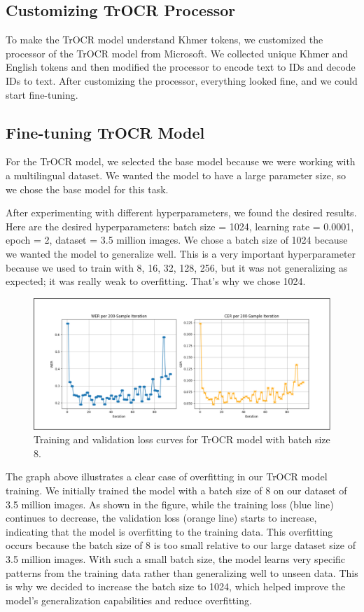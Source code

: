\subsection{Customizing TrOCR Processor}
\label{subsec:customizing-trocr-processor}
To make the TrOCR model understand Khmer tokens, we customized the processor of the TrOCR 
model from Microsoft. We collected unique Khmer and English tokens and then modified the 
processor to encode text to IDs and decode IDs to text. After customizing the processor, 
everything looked fine, and we could start fine-tuning.

\subsection{Fine-tuning TrOCR Model}
\label{subsec:fine-tuning-trocr-model}
For the TrOCR model, we selected the base model because we were working with a multilingual 
dataset. We wanted the model to have a large parameter size, so we chose the base model for 
this task.

After experimenting with different hyperparameters, we found the desired results. Here are the 
desired hyperparameters: batch size = 1024, learning rate = 0.0001, epoch = 2, dataset = 3.5 
million images. We chose a batch size of 1024 because we wanted the model to generalize well. 
This is a very important hyperparameter because we used to train with 8, 16, 32, 128, 256, 
but it was not generalizing as expected; it was really weak to overfitting. That's why we 
chose 1024.

\begin{figure}[ht]
    \centering
    \includegraphics[width=\textwidth]{figures/trocr_overfitting_v1.png}
    \caption{Training and validation loss curves for TrOCR model with batch size 8.}
    \label{fig:trocr-overfitting}
\end{figure}

The graph above illustrates a clear case of overfitting in our TrOCR model training. 
We initially trained the model with a batch size of 8 on our dataset of 3.5 million images. 
As shown in the figure, while the training loss (blue line) continues to decrease, 
the validation loss (orange line) starts to increase, indicating that the model is overfitting 
to the training data. This overfitting occurs because the batch size of 8 is too small relative 
to our large dataset size of 3.5 million images. With such a small batch size, the model learns 
very specific patterns from the training data rather than generalizing well to unseen data. 
This is why we decided to increase the batch size to 1024, which helped improve the model's 
generalization capabilities and reduce overfitting.

